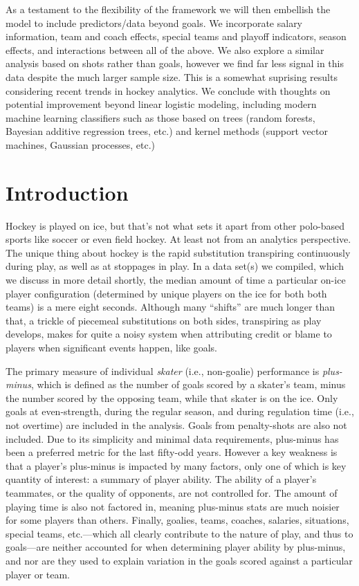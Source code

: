 As a testament to the flexibility of the framework we will then embellish the
model to include predictors/data beyond goals.  We incorporate salary
information, team and coach effects, special teams and playoff indicators,
season effects, and interactions between all of the above.  We also explore a
similar analysis based on shots rather than goals, however we find far less
signal in this data despite the much larger sample size.  This is a somewhat
suprising results considering recent trends in hockey analytics.  We conclude
with thoughts on potential improvement beyond linear logistic modeling,
including modern machine learning classifiers such as those based on trees
(random forests, Bayesian additive regression trees, etc.) and kernel methods
(support vector machines, Gaussian processes, etc.)

\section{Introduction}

Hockey is played on ice, but that's not what sets it apart from other
polo-based sports like soccer or even field hockey.  At least not from an
analytics perspective.  The unique thing about hockey is the rapid
substitution transpiring continuously during play, as well as at stoppages in
play.  In a data set(s) we compiled, which we discuss in more detail shortly, the
median amount of time a particular on-ice player configuration (determined by
unique players on the ice for both both teams) is a mere eight seconds.
Although many ``shifts'' are much longer than that, a trickle of piecemeal
substitutions on both sides, transpiring as play develops, makes for quite a
noisy system when attributing credit or blame to players when significant
events happen, like goals.

The primary measure of individual {\em skater} (i.e., non-goalie) performance
is {\em plus-minus}, which is defined as the number of goals scored by a
skater's team, minus the number scored by the opposing team, while that skater
is on the ice.  Only goals at even-strength, during the regular season, and
during regulation time (i.e., not overtime) are included in the analysis.
Goals from penalty-shots are also not included.   Due to its simplicity and
minimal data requirements, plus-minus has been a preferred metric for the last
fifty-odd years.  However a key weakness is that a player's plus-minus is
impacted by many factors, only one of which is key quantity of interest: a
summary of player ability.  The ability of a player's teammates, or the
quality of opponents, are not controlled for.  The amount of playing time is
also not factored in, meaning plus-minus stats are much noisier for some
players than others.  Finally, goalies, teams, coaches, salaries, situations,
special teams, etc.---which all clearly contribute to the nature of play, and
thus to goals---are neither accounted for when determining player ability by
plus-minus, and nor are they used to explain variation in the goals scored
against a particular player or team.  

